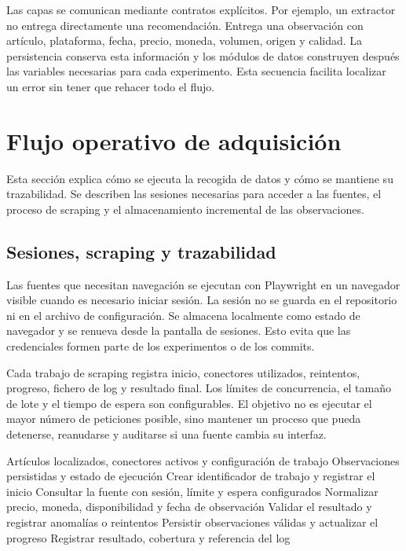 Las capas se comunican mediante contratos explícitos. Por ejemplo, un extractor no entrega directamente una recomendación. Entrega una observación con artículo, plataforma, fecha, precio, moneda, volumen, origen y calidad. La persistencia conserva esta información y los módulos de datos construyen después las variables necesarias para cada experimento. Esta secuencia facilita localizar un error sin tener que rehacer todo el flujo.

\section{Flujo operativo de adquisición}

Esta sección explica cómo se ejecuta la recogida de datos y cómo se mantiene su trazabilidad. Se describen las sesiones necesarias para acceder a las fuentes, el proceso de scraping y el almacenamiento incremental de las observaciones.

\subsection{Sesiones, scraping y trazabilidad}

Las fuentes que necesitan navegación se ejecutan con Playwright en un navegador visible cuando es necesario iniciar sesión. La sesión no se guarda en el repositorio ni en el archivo de configuración. Se almacena localmente como estado de navegador y se renueva desde la pantalla de sesiones. Esto evita que las credenciales formen parte de los experimentos o de los commits.

Cada trabajo de scraping registra inicio, conectores utilizados, reintentos, progreso, fichero de log y resultado final. Los límites de concurrencia, el tamaño de lote y el tiempo de espera son configurables. El objetivo no es ejecutar el mayor número de peticiones posible, sino mantener un proceso que pueda detenerse, reanudarse y auditarse si una fuente cambia su interfaz.

\begin{algorithm}[H]
\caption{Flujo de scraping.}
\label{alg:scraping-trazable}
\begin{algorithmic}[1]
\Require Artículos localizados, conectores activos y configuración de trabajo
\Ensure Observaciones persistidas y estado de ejecución
\State Crear identificador de trabajo y registrar el inicio
    \State Consultar la fuente con sesión, límite y espera configurados
    \State Normalizar precio, moneda, disponibilidad y fecha de observación
    \State Validar el resultado y registrar anomalías o reintentos
  \EndFor
  \State Persistir observaciones válidas y actualizar el progreso
\EndFor
\State Registrar resultado, cobertura y referencia del log
\end{algorithmic}
\end{algorithm}

